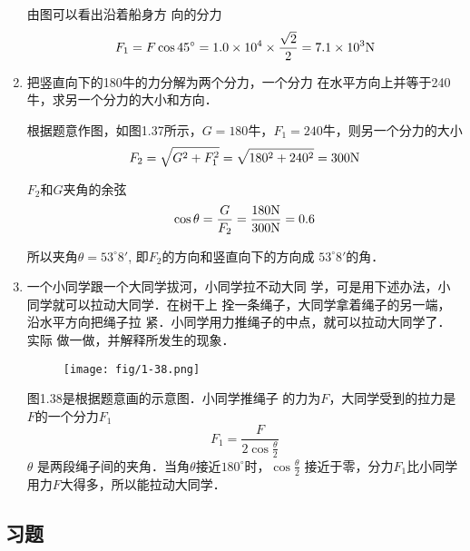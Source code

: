 \begin{enumerate}
\begin{figure}[htp]
\begin{minipage}[t]{0.48\textwidth}
    \caption{}
    \end{minipage}
    \end{figure}

\begin{solution}
    由图可以看出沿着船身方
向的分力
\[F_1=F\cos45^{\circ}=1.0\times 10^4\times \frac{\sqrt{2}}{2}=7.1\times 10^3{\rm N}\]
\end{solution}

\item 把竖直向下的180牛的力分解为两个分力，一个分力
在水平方向上并等于240牛，求另一个分力的大小和方向．

 
\begin{solution}
    根据题意作图，如图1.37所示，$G=180$牛，$F_1=240$牛，则另一个分力的大小
 \[   F_2=\sqrt{G^2+F_1^2}=\sqrt{180^2+240^2}=300{\rm N}\]

 $F_2$和$G$夹角的余弦
 \[\cos\theta=\frac{G}{F_2}=\frac{180{\rm N}}{300{\rm N}}=0.6\]

 所以夹角$\theta=53^{\circ}8'$, 即$F_2$的方向和竖直向下的方向成
$53^{\circ}8'$的角．
\end{solution}
\item 一个小同学跟一个大同学拔河，小同学拉不动大同
学，可是用下述办法，小同学就可以拉动大同学．在树干上
拴一条绳子，大同学拿着绳子的另一端，沿水平方向把绳子拉
紧．小同学用力推绳子的中点，就可以拉动大同学了．实际
做一做，并解释所发生的现象．

\begin{figure}[htp]
    \centering
\texttt{[image: fig/1-38.png]}
    \caption{}
\end{figure}

 \begin{solution}
    图1.38是根据题意画的示意图．小同学推绳子
    的力为$F$，大同学受到的拉力是$F$的一个分力$F_1$
\[F_1=\frac{F}{2\cos\frac{\theta}{2}}\]
 $\theta$   是两段绳子间的夹角．当角$\theta$接近$180^{\circ}$时，$\cos\frac{\theta}{2}$
    接近于零，分力$F_1$比小同学用力$F$大得多，所以能拉动大同学．
\end{solution}
\end{enumerate}

\subsection{习题}

